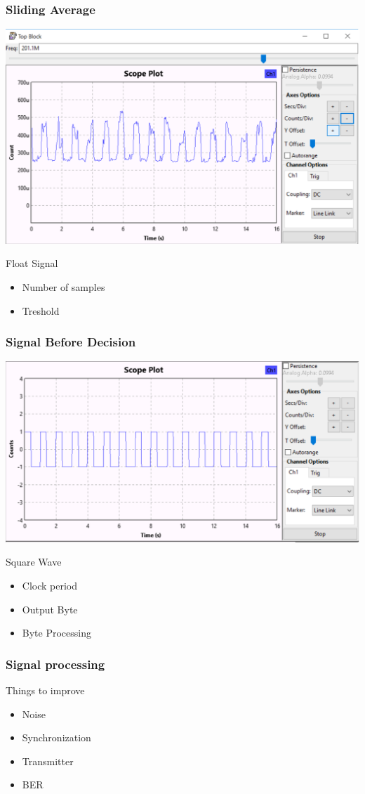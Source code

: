 \begin{frame}
	\frametitle{Sliding Average}
	\centering \includegraphics[scale=.35]{images/apres_average.png}
	\begin{block}{Float Signal}
		\begin{itemize}
			\item Number of samples
			\item Treshold
		\end{itemize}
	\end{block}
\end{frame}

\begin{frame}
	\frametitle{Signal Before Decision}
	\centering \includegraphics[scale=.35]{images/apres_add_const.png}
	\begin{block}{Square Wave}
		\begin{itemize}
			\item Clock period
			\item Output Byte
			\item Byte Processing
		\end{itemize}
	\end{block}
\end{frame}

\begin{frame}
	\frametitle{Signal processing}
	\begin{block}{Things to improve}
		\begin{itemize}
			\item Noise
			\item Synchronization
			\item Transmitter
			\item BER
		\end{itemize}
	\end{block}
\end{frame}
